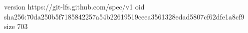 version https://git-lfs.github.com/spec/v1
oid sha256:70da250b5f7185842257a54b22619519ceea3561328edad5807cf62dfe1a8cf9
size 703
